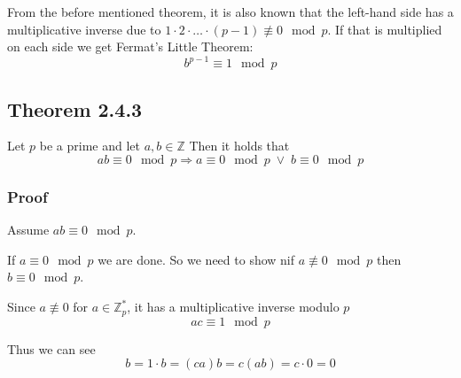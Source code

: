From the before mentioned theorem, it is also known that the left-hand
side has a multiplicative inverse due to $1 \cdot 2 \cdot \ldots \cdot
(p - 1) \not \equiv 0 \mod p$. If that is multiplied on each side we
get Fermat's Little Theorem:
\[b^{p-1} \equiv 1 \mod p \]

\subsection{Theorem 2.4.3}
Let $p$ be a prime and let $a,b \in \mathbb{Z}$ Then it holds that
\[ ab \equiv 0 \mod p \Rightarrow a \equiv 0 \mod p \; \lor \; b
\equiv 0 \mod p\]

\subsubsection*{Proof}
Assume $ab \equiv 0 \mod p$.

If $a \equiv 0 \mod p$ we are done. So we need to show nif $a \not
\equiv 0 \mod p$ then $b \equiv 0 \mod p$.

Since $a \not \equiv 0$ for $a \in \mathbb{Z}_p^*$, it has a
multiplicative inverse modulo $p$
\[ ac \equiv 1 \mod p \]

Thus we can see
\[ b = 1 \cdot b = (ca)b=c(ab) = c \cdot 0 = 0 \]